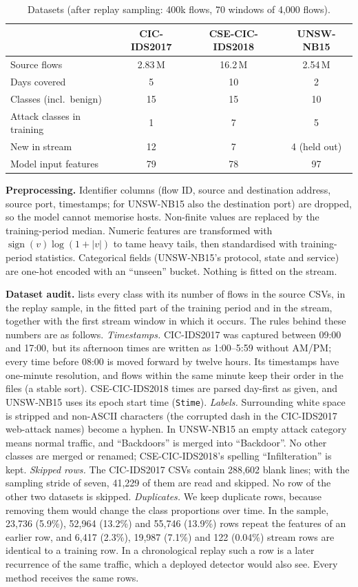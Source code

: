 \begin{table}[t]
\centering
\caption{Datasets (after replay sampling: 400k flows, 70 windows of 4{,}000 flows).}
\label{tab:datasets}
\small
\begin{tabular}{@{}lccc@{}}
\toprule
 & CIC-IDS2017 & CSE-CIC-IDS2018 & UNSW-NB15 \\
\midrule
Source flows & 2.83\,M & 16.2\,M & 2.54\,M \\
Days covered & 5 & 10 & 2 \\
Classes (incl.\ benign) & 15 & 15 & 10 \\
Attack classes in training & 1 & 7 & 5 \\
New in stream & 12 & 7 & 4 (held out) \\
Model input features & 79 & 78 & 97 \\
\bottomrule
\end{tabular}
\end{table}

\textbf{Preprocessing.} Identifier columns (flow ID, source and destination address, source port, timestamps;
for UNSW-NB15 also the destination port) are dropped, so the model cannot memorise hosts. Non-finite values are replaced by the training-period median.
Numeric features are transformed with $\operatorname{sign}(v)\log(1+|v|)$ to tame heavy tails, then standardised
with training-period statistics. Categorical fields (UNSW-NB15's protocol, state and service) are one-hot encoded
with an ``unseen'' bucket. Nothing is fitted on the stream.

\textbf{Dataset audit.}  lists every class with its number of flows in the source CSVs, in the
replay sample, in the fitted part of the training period and in the stream, together with the first stream window
in which it occurs. The rules behind these numbers are as follows.
\emph{Timestamps.} CIC-IDS2017 was captured between 09:00 and 17:00, but its afternoon times are written as
1:00--5:59 without AM/PM; every time before 08:00 is moved forward by twelve hours. Its timestamps have
one-minute resolution, and flows within the same minute keep their order in the files (a stable sort).
CSE-CIC-IDS2018 times are parsed day-first as given, and UNSW-NB15 uses its epoch start time (\texttt{Stime}).
\emph{Labels.} Surrounding white space is stripped and non-ASCII characters (the corrupted dash in the CIC-IDS2017
web-attack names) become a hyphen. In UNSW-NB15 an empty attack category means normal traffic, and
``Backdoors'' is merged into ``Backdoor''. No other classes are merged or renamed; CSE-CIC-IDS2018's spelling
``Infilteration'' is kept.
\emph{Skipped rows.} The CIC-IDS2017 CSVs contain 288{,}602 blank lines; with the sampling stride of seven,
41{,}229 of them are read and skipped. No row of the other two datasets is skipped.
\emph{Duplicates.} We keep duplicate rows, because removing them would change the class proportions over time.
In the sample, 23{,}736 (5.9\%), 52{,}964 (13.2\%) and 55{,}746 (13.9\%) rows repeat the features of an
earlier row, and 6{,}417 (2.3\%), 19{,}987 (7.1\%) and 122 (0.04\%) stream rows are identical to a training row.
In a chronological replay such a row is a later recurrence of the same traffic, which a deployed detector would
also see. Every method receives the same rows.

